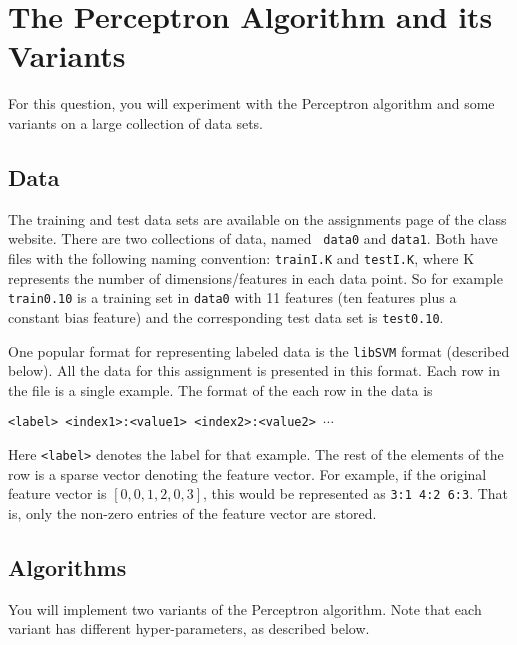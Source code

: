 \section{The Perceptron Algorithm and its Variants}
\label{sec:experiments}
For this question, you will experiment with the Perceptron algorithm
and some variants on a large collection of data sets.

\subsection*{Data}
The training and test data sets are available on the assignments page
of the class website. There are two collections of data, named {\tt
  data0} and {\tt data1}. Both have files with the following naming
convention: {\tt trainI.K} and {\tt testI.K}, where K represents the
number of dimensions/features in each data point. So for example {\tt
  train0.10} is a training set in {\tt data0} with 11 features (ten
features plus a constant bias feature) and the corresponding test data
set is {\tt test0.10}.

One popular format for representing labeled data is the {\tt libSVM}
format (described below). All the data for this assignment is
presented in this format. Each row in the file is a single example.
The format of the each row in the data is

{\tt <label> <index1>:<value1> <index2>:<value2> $\cdots$}

Here {\tt <label>} denotes the label for that example. The rest of the
elements of the row is a sparse vector denoting the feature vector.
For example, if the original feature vector is $[0, 0, 1, 2, 0, 3]$,
this would be represented as {\tt 3:1 4:2 6:3}. That is, only the
non-zero entries of the feature vector are stored.

\subsection*{Algorithms}
You will implement two variants of the Perceptron algorithm. Note that
each variant has different hyper-parameters, as described below.

